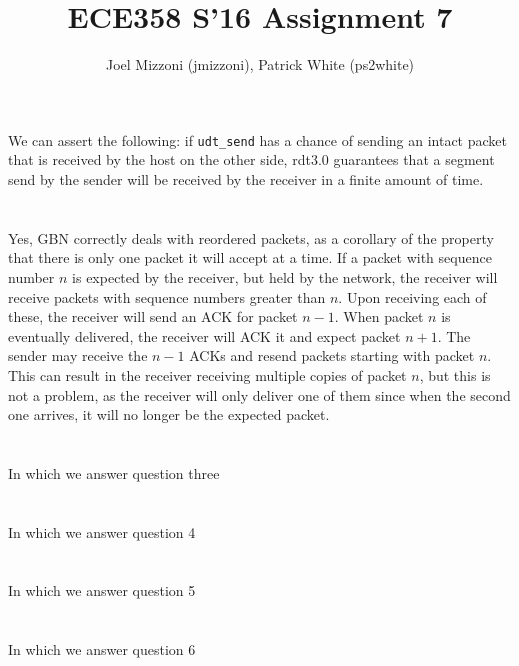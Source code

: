 \documentclass[10pt,a4paper]{article}
\author{Joel Mizzoni (jmizzoni), Patrick White (ps2white)}
\begin{document}
\title{ECE358 S'16 Assignment 7}
\maketitle
\section{}
We can assert the following: if \texttt{udt\_send} has a chance of sending an intact packet that is received by the host on the other side, rdt3.0 guarantees that a segment send by the sender will be received by the receiver in a finite amount of time.
\section{}
Yes, GBN correctly deals with reordered packets, as a corollary of the property that there is only one packet it will accept at a time.
If a packet with sequence number $n$ is expected by the receiver, but held by the network, the receiver will receive packets with sequence numbers greater than $n$.
Upon receiving each of these, the receiver will send an ACK for packet $n-1$.
When packet $n$ is eventually delivered, the receiver will ACK it and expect packet $n+1$.
The sender may receive the $n-1$ ACKs and resend packets starting with packet $n$.
This can result in the receiver receiving multiple copies of packet $n$, but this is not a problem, as the receiver will only deliver one of them since when the second one arrives, it will no longer be the expected packet.
\section{}
In which we answer question three
\section{}
In which we answer question 4
\section{}
In which we answer question 5
\section{}
In which we answer question 6
\end{document}
